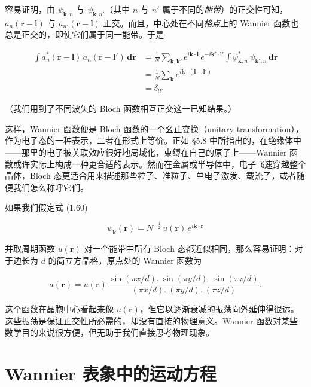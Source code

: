 容易证明，由 $\psi_{\mathbf{k},n}$ 与 $\psi_{\mathbf{k},n'}$（其中 $n$ 与 $n'$ 属于不同的\emph{能带}）的正交性可知，$a_n(\mathbf{r}-\boldsymbol{l})$ 与 $a_{n'}(\mathbf{r}-\boldsymbol{l})$ 正交。而且，中心处在不同\emph{格点}上的 Wannier 函数也总是正交的，即使它们属于同一能带。于是

\begin{align*}
\int a_n^{*}(\mathbf{r}-\boldsymbol{l})\,a_n(\mathbf{r}-\boldsymbol{l}')\,\mathbf{dr} &= \frac{1}{N}\sum_{\mathbf{k},\mathbf{k}'} e^{i\mathbf{k}\cdot\boldsymbol{l}}\,e^{-i\mathbf{k}'\cdot\boldsymbol{l}'} \int \psi_{\mathbf{k},n}^{*}\,\psi_{\mathbf{k}',n}\,\mathbf{dr} \\
&= \frac{1}{N}\sum_{\mathbf{k}} e^{i\mathbf{k}\cdot(\boldsymbol{l}-\boldsymbol{l}')} \\
&= \delta_{ll'} \tag{6.13}
\end{align*}

（我们用到了不同波矢的 Bloch 函数相互正交这一已知结果。）


这样，Wannier 函数便是 Bloch 函数的一个幺正变换（unitary transformation），作为电子态的一种表示，二者在形式上等价。正如 §5.8 中所指出的，在绝缘体中——那里的电子被关联效应很好地局域化，束缚在自己的原子上——Wannier 函数或许实际上构成一种更合适的表示。然而在金属或半导体中，电子飞速穿越整个晶体，Bloch 态更适合用来描述那些粒子、准粒子、单电子激发、载流子，或者随便我们怎么称呼它们。

如果我们假定式 (1.60)

\begin{equation*}
\psi_{\mathbf{k}}(\mathbf{r}) = N^{-\frac{1}{2}}\,u(\mathbf{r})\,e^{i\mathbf{k}\cdot\mathbf{r}}
\tag{6.14}
\end{equation*}

并取周期函数 $u(\mathbf{r})$ 对一个能带中所有 Bloch 态都近似相同，那么容易证明：对于边长为 $d$ 的简立方晶格，原点处的 Wannier 函数为

\begin{equation*}
a(\mathbf{r}) = u(\mathbf{r})\,\frac{\sin(\pi x/d).\ \sin(\pi y/d).\ \sin(\pi z/d)}{(\pi x/d).\ (\pi y/d).\ (\pi z/d)}.
\tag{6.15}
\end{equation*}

这个函数在晶胞中心看起来像 $u(\mathbf{r})$，但它以逐渐衰减的振荡向外延伸得很远。这些振荡是保证正交性所必需的，却没有直接的物理意义。Wannier 函数对某些数学目的来说很方便，但无助于我们直接思考物理现象。

\section{Wannier 表象中的运动方程}

